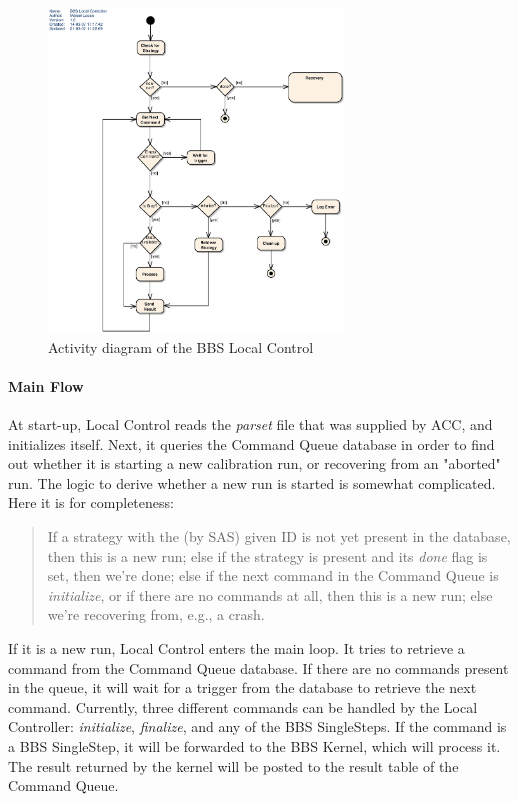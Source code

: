 \documentclass[10pt]{lofar}
\begin{document}
\begin{figure}[!ht]
\centering
\includegraphics[width=0.7\textwidth]{images/bbs-local-control-activity-diagram}
\caption{Activity diagram of the BBS Local Control}
\label{fig:local-control-activity-diagram}
\end{figure}

\paragraph*{Main Flow}
At start-up, Local Control reads the \emph{parset} file that was supplied by
ACC, and initializes itself. Next, it queries the Command Queue database in
order to find out whether it is starting a new calibration run, or recovering
from an "aborted" run. The logic to derive whether a new run is started is
somewhat complicated. Here it is for completeness:
\begin{quote}
If a strategy with the (by SAS) given ID is not yet present in the database,
then this is a new run; else if the strategy is present and its \textit{done}
flag is set, then we're done; else if the next command in the Command Queue is
\textit{initialize}, or if there are no commands at all, then this is a new
run; else we're recovering from, e.g., a crash.
\end{quote}
If it is a new run, Local Control enters the main loop. It tries to retrieve a
command from the Command Queue database. If there are no commands present in
the queue, it will wait for a trigger from the database to retrieve the next
command. Currently, three different commands can be handled by the Local
Controller: \textit{initialize}, \textit{finalize}, and any of the BBS
SingleSteps. If the command is a BBS SingleStep, it will be forwarded to the
BBS Kernel, which will process it. The result returned by the kernel will be
posted to the result table of the Command Queue. 
\end{document}
